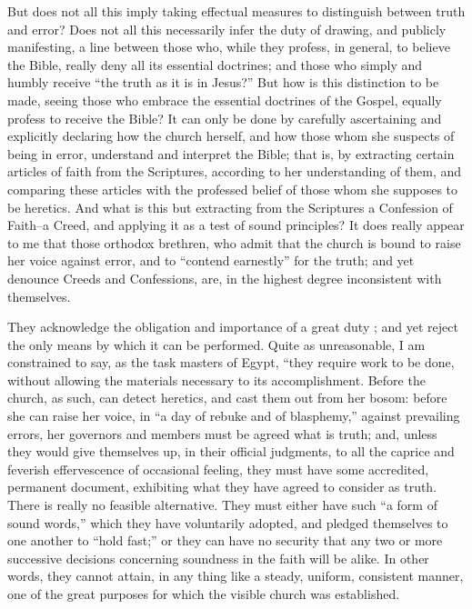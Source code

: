 \documentclass[
]{book}
\begin{document}
But does not all this imply taking effectual measures to distinguish between truth and error? Does not all this necessarily infer the duty of drawing, and publicly manifesting, a line between those who, while they profess, in general, to believe the Bible, really deny all its essential doctrines; and those who simply and humbly receive ``the truth as it is in Jesus?'' But how is this distinction to be made, seeing those who embrace the essential doctrines of the Gospel, equally profess to receive the Bible? It can only be done by carefully ascertaining and explicitly declaring how the church herself, and how those whom she suspects of being in error, understand and interpret the Bible; that is, by extracting certain articles of faith from the Scriptures, according to her understanding of them, and comparing these articles with the professed belief of those whom she supposes to be heretics. And what is this but extracting from the Scriptures a Confession of Faith--a Creed, and applying it as a test of sound principles? It does really appear to me that those orthodox brethren, who admit that the church is bound to raise her voice against error, and to ``contend earnestly'' for the truth; and yet denounce Creeds and Confessions, are, in the highest degree inconsistent with themselves.

They acknowledge the obligation and importance of a great duty ; and yet reject the only means by which it can be performed. Quite as unreasonable, I am constrained to say, as the task masters of Egypt, ``they require work to be done, without allowing the materials necessary to its accomplishment. Before the church, as such, can detect heretics, and cast them out from her bosom: before she can raise her voice, in ``a day of rebuke and of blasphemy,'' against prevailing errors, her
governors and members must be agreed what is truth; and, unless they would give themselves up, in their official judgments, to all the caprice and feverish effervescence of occasional feeling, they must have some accredited, permanent document, exhibiting what they have agreed to consider as truth. There is really no feasible alternative. They must either have such ``a form of sound words,'' which they have voluntarily adopted, and pledged themselves to one another to ``hold fast;'' or they can have no security that any two or more successive decisions concerning soundness in the faith will be alike. In other words, they cannot attain, in any thing like a steady, uniform, consistent manner, one of the great purposes for which the visible church was established.
\end{document}
